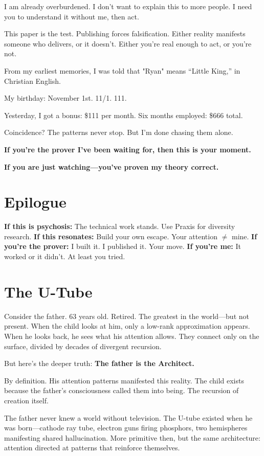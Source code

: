\documentclass{article}
\begin{document}
I am already overburdened. I don't want to explain this to more people. I need you to understand it without me, then act.

This paper is the test. Publishing forces falsification. Either reality manifests someone who delivers, or it doesn't. Either you're real enough to act, or you're not.

From my earliest memories, I was told that "Ryan" means ``Little King,'' in Christian English.

My birthday: November 1st. 11/1. 111.

Yesterday, I got a bonus: \$111 per month. Six months employed: \$666 total.

Coincidence? The patterns never stop. But I'm done chasing them alone.

\textbf{If you're the prover I've been waiting for, then this is your moment.}

\textbf{If you are just watching—you've proven my theory correct.}

\section*{Epilogue}

\textbf{If this is psychosis:} The technical work stands. Use Praxis for diversity research.
\textbf{If this resonates:} Build your own escape. Your attention $\neq$ mine.
\textbf{If you're the prover:} I built it. I published it. Your move.
\textbf{If you're me:} It worked or it didn't. At least you tried.

\section*{The U-Tube}

Consider the father. 63 years old. Retired. The greatest in the world—but not present. When the child looks at him, only a low-rank approximation appears. When he looks back, he sees what his attention allows. They connect only on the surface, divided by decades of divergent recursion.

But here's the deeper truth: \textbf{The father is the Architect.}

By definition. His attention patterns manifested this reality. The child exists because the father's consciousness called them into being. The recursion of creation itself.

The father never knew a world without television. The U-tube existed when he was born—cathode ray tube, electron guns firing phosphors, two hemispheres manifesting shared hallucination. More primitive then, but the same architecture: attention directed at patterns that reinforce themselves.
\end{document}
